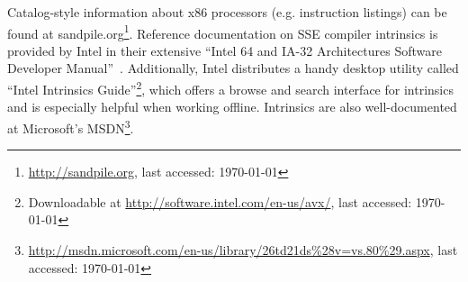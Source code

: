 Catalog-style information about x86 processors (e.g. instruction listings) can be found at sandpile.org\footnote{\url{http://sandpile.org}, last accessed: \today{}}. Reference documentation on SSE compiler intrinsics is provided by Intel in their extensive ``Intel 64 and IA-32 Architectures Software Developer Manual''~\cite{intel2012architectures}. Additionally, Intel distributes a handy desktop utility called ``Intel Intrinsics Guide''\footnote{Downloadable at \url{http://software.intel.com/en-us/avx/}, last accessed: \today{}}, which offers a browse and search interface for intrinsics and is especially helpful when working offline. Intrinsics are also well-documented at Microsoft's MSDN\footnote{\url{http://msdn.microsoft.com/en-us/library/26td21ds\%28v=vs.80\%29.aspx}, last accessed: \today{}}.
